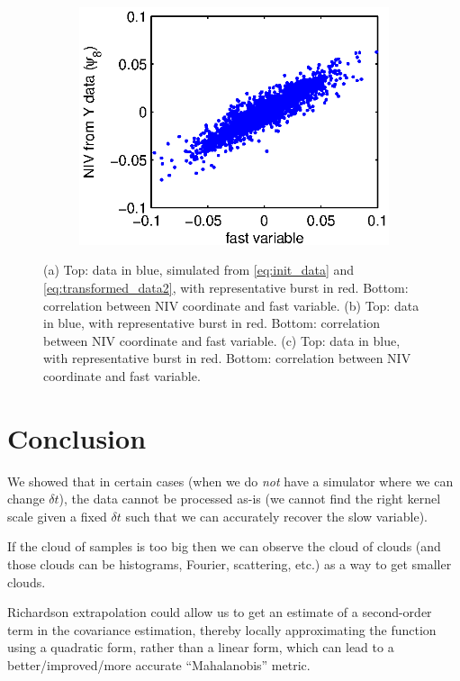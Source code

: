 \documentclass[1p]{elsarticle}
\begin{document}
\begin{figure}[h]
\begin{subfigure}{0.3\textwidth}
\includegraphics[width=\textwidth]{fast_var_corr_3}
\caption{}
\end{subfigure}
\caption{
(a) Top: data in blue, simulated from \eqref{eq:init_data} and \eqref{eq:transformed_data2}, with representative burst in red.  
%
Bottom: correlation between NIV coordinate and fast variable. 
%
(b) Top: data in blue, with representative burst in red.  
%
Bottom: correlation between NIV coordinate and fast variable. 
%
(c) Top: data in blue, with representative burst in red.  
%
Bottom: correlation between NIV coordinate and fast variable. }
\label{fig:vary_burst}
\end{figure}

\section{Conclusion}

We showed that in certain cases (when we do {\em not} have a simulator where we can change $\delta t$), the data cannot be processed as-is (we cannot find the right kernel scale given a fixed $\delta t$ such that we can accurately recover the slow variable). 

If the cloud of samples is too big then we can observe the cloud of clouds (and those clouds can be histograms, Fourier, scattering, etc.) as a way to get smaller clouds. 


Richardson extrapolation could allow us to get an estimate of a second-order term in the covariance estimation, thereby locally approximating the function using a quadratic form, rather than a linear form,  which can lead to a better/improved/more accurate ``Mahalanobis'' metric. 
\end{document}
